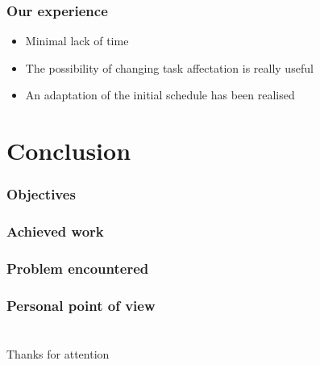 \documentclass[xcolor=table]{beamer}
\begin{document}
\begin{frame} \frametitle{Our experience}
\begin{itemize}
\item Minimal lack of time
\item The possibility of changing task affectation is really useful
\item An adaptation of the initial schedule has been realised
\end{itemize}

\end{frame}



\section{Conclusion}


\begin{frame} \frametitle{Objectives}

\end{frame}


\begin{frame} \frametitle{Achieved work}

\end{frame}


\begin{frame} \frametitle{Problem encountered}

\end{frame}


\begin{frame} \frametitle{Personal point of view}

\end{frame}






\section{}
\begin{frame}\frametitle{}
    \begin{center}
        Thanks for attention
    \end{center}
\end{frame}
\end{document}
